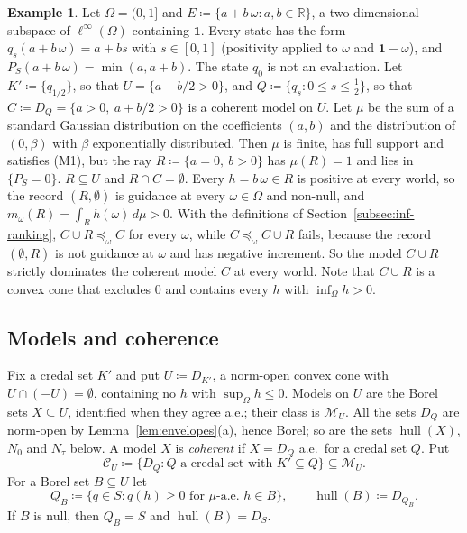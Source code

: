 \documentclass[11pt]{article}
\newcommand{\R}{\mathbb{R}}
\newcommand{\one}{\mathbf{1}}
\newcommand{\M}{\mathcal{M}}
\newcommand{\CC}{\mathcal{C}}
\newcommand{\hull}{\operatorname{hull}}
\theoremstyle{plain}
\theoremstyle{definition}
\newtheorem{example}[theorem]{Example}
\theoremstyle{remark}
\begin{document}
\begin{example}\label{ex:PS}
Let $\Omega=(0,1]$ and $E\coloneqq\{a+b\,\omega:a,b\in\R\}$, a two-dimensional subspace of
$\ell^\infty(\Omega)$ containing $\one$. Every state has the form $q_s(a+b\,\omega)=a+bs$
with $s\in[0,1]$ (positivity applied to $\omega$ and $\one-\omega$), and $P_S(a+b\,\omega)
=\min(a,a+b)$. The state $q_0$ is not an evaluation. Let $K'\coloneqq\{q_{1/2}\}$, so that
$U=\{a+b/2>0\}$, and $Q\coloneqq\{q_s:0\le s\le\tfrac12\}$, so that $C\coloneqq D_Q=\{a>0,
\ a+b/2>0\}$ is a coherent model on $U$. Let $\mu$ be the sum of a standard Gaussian
distribution on the coefficients $(a,b)$ and the distribution of $(0,\beta)$ with $\beta$
exponentially distributed. Then $\mu$ is finite, has full support and satisfies (M1), but
the ray $R\coloneqq\{a=0,\ b>0\}$ has $\mu(R)=1$ and lies in $\{P_S=0\}$. $R\subseteq U$
and $R\cap C=\emptyset$. Every $h=b\,\omega\in R$ is positive at every world, so the record
$(R,\emptyset)$ is guidance at every $\omega\in\Omega$ and non-null, and $m_\omega(R)=
\int_Rh(\omega)\,d\mu>0$. With the definitions of Section~\ref{subsec:inf-ranking},
$C\cup R\preceq_\omega C$ for every $\omega$, while $C\preceq_\omega C\cup R$ fails, because
the record $(\emptyset,R)$ is not guidance at $\omega$ and has negative increment. So the
model $C\cup R$ strictly dominates the coherent model $C$ at every world. Note that
$C\cup R$ is a convex cone that excludes $0$ and contains every $h$ with
$\inf_\Omega h>0$.
\end{example}

\subsection{Models and coherence}

Fix a credal set $K'$ and put $U\coloneqq D_{K'}$, a norm-open convex cone with
$U\cap(-U)=\emptyset$, containing no $h$ with $\sup_\Omega h\le0$. Models on $U$ are the
Borel sets $X\subseteq U$, identified when they agree a.e.; their class is $\M_U$. All the
sets $D_Q$ are norm-open by Lemma~\ref{lem:envelopes}(a), hence Borel; so are the sets
$\hull(X)$, $N_0$ and $N_\tau$ below. A model $X$ is \emph{coherent} if $X=D_Q$ a.e.\ for
a credal set $Q$. Put
\[
  \CC_U\coloneqq\{D_Q:Q\text{ a credal set with }K'\subseteq Q\}\subseteq\M_U .
\]
For a Borel set $B\subseteq U$ let
\[
  Q_B\coloneqq\{q\in S:q(h)\ge0\text{ for $\mu$-a.e.\ }h\in B\},\qquad\hull(B)\coloneqq
  D_{Q_B}.
\]
If $B$ is null, then $Q_B=S$ and $\hull(B)=D_S$.
\end{document}
